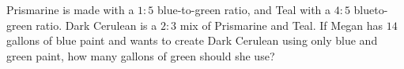 Prismarine is made with a $1 : 5$ blue-to-green ratio, and Teal with a $4 : 5$ blueto-green ratio. Dark Cerulean is a $2 : 3$ mix of Prismarine and Teal. If Megan has $14$ gallons of blue paint and wants to create Dark Cerulean using only blue and green paint, how many gallons of green should she use?
